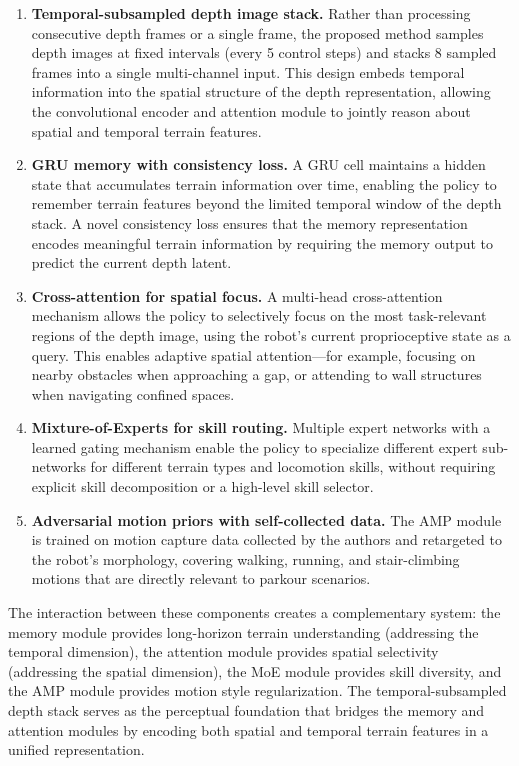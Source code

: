 \begin{enumerate}
    \item \textbf{Temporal-subsampled depth image stack.} Rather than processing consecutive depth frames or a single frame, the proposed method samples depth images at fixed intervals (every 5 control steps) and stacks 8 sampled frames into a single multi-channel input. This design embeds temporal information into the spatial structure of the depth representation, allowing the convolutional encoder and attention module to jointly reason about spatial and temporal terrain features.

    \item \textbf{GRU memory with consistency loss.} A GRU cell maintains a hidden state that accumulates terrain information over time, enabling the policy to remember terrain features beyond the limited temporal window of the depth stack. A novel consistency loss ensures that the memory representation encodes meaningful terrain information by requiring the memory output to predict the current depth latent.

    \item \textbf{Cross-attention for spatial focus.} A multi-head cross-attention mechanism allows the policy to selectively focus on the most task-relevant regions of the depth image, using the robot's current proprioceptive state as a query. This enables adaptive spatial attention---for example, focusing on nearby obstacles when approaching a gap, or attending to wall structures when navigating confined spaces.

    \item \textbf{Mixture-of-Experts for skill routing.} Multiple expert networks with a learned gating mechanism enable the policy to specialize different expert sub-networks for different terrain types and locomotion skills, without requiring explicit skill decomposition or a high-level skill selector.

    \item \textbf{Adversarial motion priors with self-collected data.} The AMP module is trained on motion capture data collected by the authors and retargeted to the robot's morphology, covering walking, running, and stair-climbing motions that are directly relevant to parkour scenarios.
\end{enumerate}

The interaction between these components creates a complementary system: the memory module provides long-horizon terrain understanding (addressing the temporal dimension), the attention module provides spatial selectivity (addressing the spatial dimension), the MoE module provides skill diversity, and the AMP module provides motion style regularization. The temporal-subsampled depth stack serves as the perceptual foundation that bridges the memory and attention modules by encoding both spatial and temporal terrain features in a unified representation.

